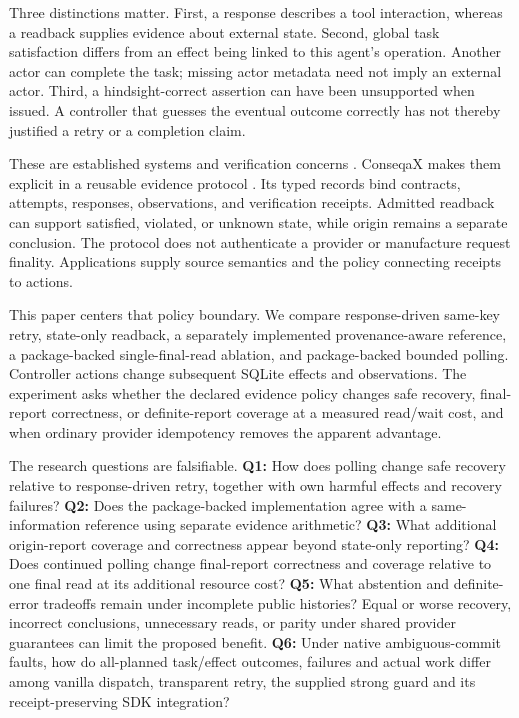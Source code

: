\documentclass[conference]{IEEEtran}
\begin{document}
Three distinctions matter. First, a response describes a tool interaction, whereas a readback supplies evidence about external state. Second, global task satisfaction differs from an effect being linked to this agent's operation. Another actor can complete the task; missing actor metadata need not imply an external actor. Third, a hindsight-correct assertion can have been unsupported when issued. A controller that guesses the eventual outcome correctly has not thereby justified a retry or a completion claim.

These are established systems and verification concerns \cite{helland,vogels,verified,operability,agenttool,limbo}. ConseqaX makes them explicit in a reusable evidence protocol \cite{artifact}. Its typed records bind contracts, attempts, responses, observations, and verification receipts. Admitted readback can support satisfied, violated, or unknown state, while origin remains a separate conclusion. The protocol does not authenticate a provider or manufacture request finality. Applications supply source semantics and the policy connecting receipts to actions.

This paper centers that policy boundary. We compare response-driven same-key retry, state-only readback, a separately implemented provenance-aware reference, a package-backed single-final-read ablation, and package-backed bounded polling. Controller actions change subsequent SQLite effects and observations. The experiment asks whether the declared evidence policy changes safe recovery, final-report correctness, or definite-report coverage at a measured read/wait cost, and when ordinary provider idempotency removes the apparent advantage.

The research questions are falsifiable. \textbf{Q1:} How does polling change safe recovery relative to response-driven retry, together with own harmful effects and recovery failures? \textbf{Q2:} Does the package-backed implementation agree with a same-information reference using separate evidence arithmetic? \textbf{Q3:} What additional origin-report coverage and correctness appear beyond state-only reporting? \textbf{Q4:} Does continued polling change final-report correctness and coverage relative to one final read at its additional resource cost? \textbf{Q5:} What abstention and definite-error tradeoffs remain under incomplete public histories? Equal or worse recovery, incorrect conclusions, unnecessary reads, or parity under shared provider guarantees can limit the proposed benefit. \textbf{Q6:} Under native ambiguous-commit faults, how do all-planned task/effect outcomes, failures and actual work differ among vanilla dispatch, transparent retry, the supplied strong guard and its receipt-preserving SDK integration?
\end{document}
